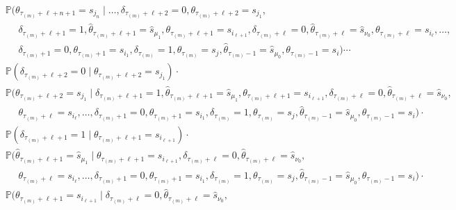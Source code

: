 \documentclass[journal,twoside,web]{ieeecolor}
\begin{document}
\begin{figure*}[ht]
\begin{align}
\begin{aligned}
& \qquad\quad~~~\! 
\mathbb{P}(\theta_{\tau_{(m)}+\ell+n+1} = s_{j_{n}} \mid \dots, 
\delta_{\tau_{(m)}+\ell+2}=0,\theta_{\tau_{(m)}+\ell+2} = s_{j_{1}}, \\
& \qquad\qquad\quad\! \delta_{\tau_{(m)}+\ell+1}=1, \hat{\theta}_{\tau_{(m)}+\ell+1} = \hat{s}_{\mu_1}, \theta_{\tau_{(m)}+\ell+1}=s_{i_{\ell+1}}, \delta_{\tau_{(m)}+\ell}=0, \hat{\theta}_{\tau_{(m)}+\ell} = \hat{s}_{\nu_{0}},\theta_{\tau_{(m)}+\ell}=s_{i_{\ell}},\dots, \\
& \qquad\qquad\quad\! 
\delta_{\tau_{(m)}+1}=0,\theta_{\tau_{(m)}+1}=s_{i_{1}},\delta_{\tau_{(m)}}=1,\theta_{\tau_{(m)}}=s_j,\hat{\theta}_{\tau_{(m)}-1} = \hat{s}_{\mu_0},\theta_{\tau_{(m)}-1}=s_i) \cdots \\
& \qquad\quad~~~\! 
\mathbb{P}(\delta_{\tau_{(m)}+\ell+2}=0 \mid \theta_{\tau_{(m)}+\ell+2} = s_{j_{1}}) \cdot \\
& \qquad\quad~~~\! 
\mathbb{P}(\theta_{\tau_{(m)}+\ell+2} = s_{j_{1}} \mid \delta_{\tau_{(m)}+\ell+1}=1, \hat{\theta}_{\tau_{(m)}+\ell+1} = \hat{s}_{\mu_1}, \theta_{\tau_{(m)}+\ell+1}=s_{i_{\ell+1}}, \delta_{\tau_{(m)}+\ell}=0, \hat{\theta}_{\tau_{(m)}+\ell} = \hat{s}_{\nu_{0}}, \\
& \qquad\qquad\quad\! \theta_{\tau_{(m)}+\ell}=s_{i_{\ell}},\dots,
\delta_{\tau_{(m)}+1}=0,\theta_{\tau_{(m)}+1}=s_{i_{1}},\delta_{\tau_{(m)}}=1,\theta_{\tau_{(m)}}=s_j,\hat{\theta}_{\tau_{(m)}-1} = \hat{s}_{\mu_0}, \theta_{\tau_{(m)}-1}=s_i) \cdot \\
& \qquad\quad~~~\! 
\mathbb{P}(\delta_{\tau_{(m)}+\ell+1}=1 \mid \theta_{\tau_{(m)}+\ell+1}=s_{i_{\ell+1}}) \cdot \\
& \qquad\quad~~~\! 
\mathbb{P}(\hat{\theta}_{\tau_{(m)}+\ell+1} = \hat{s}_{\mu_1} \mid \theta_{\tau_{(m)}+\ell+1}=s_{i_{\ell+1}}, \delta_{\tau_{(m)}+\ell}=0, \hat{\theta}_{\tau_{(m)}+\ell} = \hat{s}_{\nu_{0}}, \\
& \qquad\qquad\quad\! \theta_{\tau_{(m)}+\ell}=s_{i_{\ell}},\dots,
\delta_{\tau_{(m)}+1}=0,\theta_{\tau_{(m)}+1}=s_{i_{1}},\delta_{\tau_{(m)}}=1,\theta_{\tau_{(m)}}=s_j,\hat{\theta}_{\tau_{(m)}-1} = \hat{s}_{\mu_0}, \theta_{\tau_{(m)}-1}=s_i) \cdot \\
& \qquad\quad~~~\! 
\mathbb{P}(\theta_{\tau_{(m)}+\ell+1}=s_{i_{\ell+1}} \mid \delta_{\tau_{(m)}+\ell}=0, \hat{\theta}_{\tau_{(m)}+\ell} = \hat{s}_{\nu_{0}}, \\

\end{aligned}
\end{align}
\end{figure*}
\end{document}
